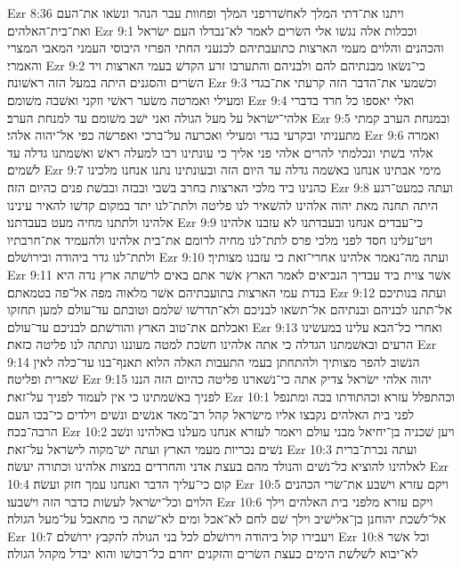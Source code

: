 Ezr 8:36  ויתנו את־דתי המלך לאחשׁדרפני המלך ופחוות עבר הנהר ונשׂאו את־העם ואת־בית־האלהים׃
Ezr 9:1  וככלות אלה נגשׁו אלי השׂרים לאמר לא־נבדלו העם ישׂראל והכהנים והלוים מעמי הארצות כתועבתיהם לכנעני החתי הפרזי היבוסי העמני המאבי המצרי והאמרי׃
Ezr 9:2  כי־נשׂאו מבנתיהם להם ולבניהם והתערבו זרע הקדשׁ בעמי הארצות ויד השׂרים והסגנים היתה במעל הזה ראשׁונה׃
Ezr 9:3  וכשׁמעי את־הדבר הזה קרעתי את־בגדי ומעילי ואמרטה משׂער ראשׁי וזקני ואשׁבה משׁומם׃
Ezr 9:4  ואלי יאספו כל חרד בדברי אלהי־ישׂראל על מעל הגולה ואני ישׁב משׁומם עד למנחת הערב׃
Ezr 9:5  ובמנחת הערב קמתי מתעניתי ובקרעי בגדי ומעילי ואכרעה על־ברכי ואפרשׂה כפי אל־יהוה אלהי׃
Ezr 9:6  ואמרה אלהי בשׁתי ונכלמתי להרים אלהי פני אליך כי עונתינו רבו למעלה ראשׁ ואשׁמתנו גדלה עד לשׁמים׃
Ezr 9:7  מימי אבתינו אנחנו באשׁמה גדלה עד היום הזה ובעונתינו נתנו אנחנו מלכינו כהנינו ביד מלכי הארצות בחרב בשׁבי ובבזה ובבשׁת פנים כהיום הזה׃
Ezr 9:8  ועתה כמעט־רגע היתה תחנה מאת יהוה אלהינו להשׁאיר לנו פליטה ולתת־לנו יתד במקום קדשׁו להאיר עינינו אלהינו ולתתנו מחיה מעט בעבדתנו׃
Ezr 9:9  כי־עבדים אנחנו ובעבדתנו לא עזבנו אלהינו ויט־עלינו חסד לפני מלכי פרס לתת־לנו מחיה לרומם את־בית אלהינו ולהעמיד את־חרבתיו ולתת־לנו גדר ביהודה ובירושׁלם׃
Ezr 9:10  ועתה מה־נאמר אלהינו אחרי־זאת כי עזבנו מצותיך׃
Ezr 9:11  אשׁר צוית ביד עבדיך הנביאים לאמר הארץ אשׁר אתם באים לרשׁתה ארץ נדה היא בנדת עמי הארצות בתועבתיהם אשׁר מלאוה מפה אל־פה בטמאתם׃
Ezr 9:12  ועתה בנותיכם אל־תתנו לבניהם ובנתיהם אל־תשׂאו לבניכם ולא־תדרשׁו שׁלמם וטובתם עד־עולם למען תחזקו ואכלתם את־טוב הארץ והורשׁתם לבניכם עד־עולם׃
Ezr 9:13  ואחרי כל־הבא עלינו במעשׂינו הרעים ובאשׁמתנו הגדלה כי אתה אלהינו חשׂכת למטה מעוננו ונתתה לנו פליטה כזאת׃
Ezr 9:14  הנשׁוב להפר מצותיך ולהתחתן בעמי התעבות האלה הלוא תאנף־בנו עד־כלה לאין שׁארית ופליטה׃
Ezr 9:15  יהוה אלהי ישׂראל צדיק אתה כי־נשׁארנו פליטה כהיום הזה הננו לפניך באשׁמתינו כי אין לעמוד לפניך על־זאת׃
Ezr 10:1  וכהתפלל עזרא וכהתודתו בכה ומתנפל לפני בית האלהים נקבצו אליו מישׂראל קהל רב־מאד אנשׁים ונשׁים וילדים כי־בכו העם הרבה־בכה׃
Ezr 10:2  ויען שׁכניה בן־יחיאל מבני עולם ויאמר לעזרא אנחנו מעלנו באלהינו ונשׁב נשׁים נכריות מעמי הארץ ועתה ישׁ־מקוה לישׂראל על־זאת׃
Ezr 10:3  ועתה נכרת־ברית לאלהינו להוציא כל־נשׁים והנולד מהם בעצת אדני והחרדים במצות אלהינו וכתורה יעשׂה׃
Ezr 10:4  קום כי־עליך הדבר ואנחנו עמך חזק ועשׂה׃
Ezr 10:5  ויקם עזרא וישׁבע את־שׂרי הכהנים הלוים וכל־ישׂראל לעשׂות כדבר הזה וישׁבעו׃
Ezr 10:6  ויקם עזרא מלפני בית האלהים וילך אל־לשׁכת יהוחנן בן־אלישׁיב וילך שׁם לחם לא־אכל ומים לא־שׁתה כי מתאבל על־מעל הגולה׃
Ezr 10:7  ויעבירו קול ביהודה וירושׁלם לכל בני הגולה להקבץ ירושׁלם׃
Ezr 10:8  וכל אשׁר לא־יבוא לשׁלשׁת הימים כעצת השׂרים והזקנים יחרם כל־רכושׁו והוא יבדל מקהל הגולה׃
